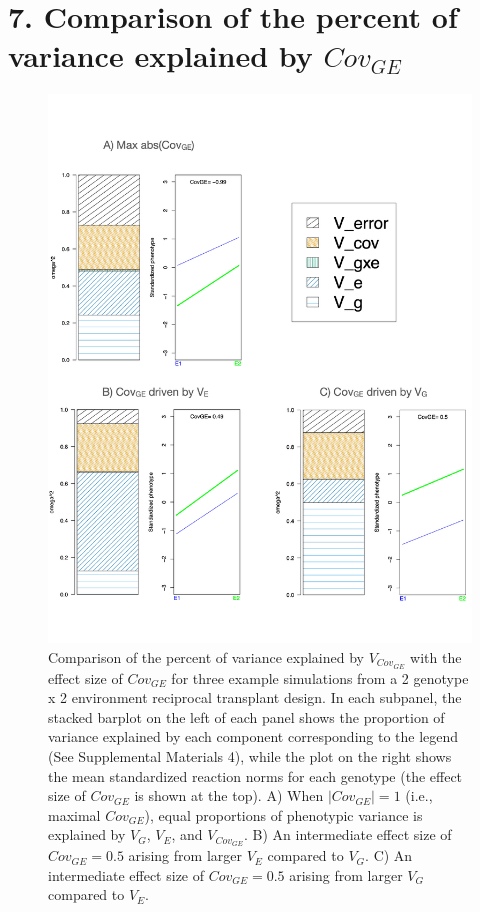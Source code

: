 \documentclass[11pt, oneside]{amsart}
\begin{document}
\section{7. Comparison of the percent of variance explained by $Cov_{GE}$}
\renewcommand\thefigure{S7}
\begin{figure}[h]
\begin{center}
\includegraphics[width=6in]{Figs/EstimateVsVariance.pdf}
\end{center}
\label{Fig: }
\caption[Comparison of the percent of variance explained by $V_{Cov_{GE}}$ with the effect size $Cov_{GE}$ for three example simulations from a 2 genotype x 2 environment reciprocal transplant design.]{Comparison of the percent of variance explained by $V_{Cov_{GE}}$ with the effect size of $Cov_{GE}$ for three example simulations from a 2 genotype x 2 environment reciprocal transplant design. In each subpanel, the stacked barplot on the left of each panel shows the proportion of variance explained by each component corresponding to the legend (See Supplemental Materials 4), while the plot on the right shows the mean standardized reaction norms for each genotype (the effect size of $Cov_{GE}$ is shown at the top). A) When $| Cov_{GE} | = 1$ (i.e., maximal $Cov_{GE}$), equal proportions of phenotypic variance is explained by $V_G$, $V_E$, and $V_{Cov_{GE}}$. B) An intermediate effect size of  $Cov_{GE} = 0.5$ arising from larger $V_E$ compared to $V_G$.  C) An intermediate effect size of  $Cov_{GE} = 0.5$ arising from larger $V_G$ compared to $V_E$.  }
\end{figure}
\end{document}
